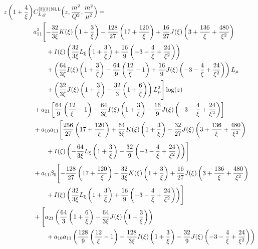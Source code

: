 \documentclass[a4paper]{article}
\begin{document}
\begin{equation}
	\begin{split}
		z \left(1 + \frac{4}{\xi}\right) &C_{L,g}^{[3](3) \rm NLL}\Bigl(z,\frac{m^2}{Q^2},\frac{m^2}{\mu^2}\Bigr)= \\
		& a_{11}^2 \Biggl[ -\frac{32}{3 \xi} K(\xi) \left(1 + \frac{3}{\xi}\right) - \frac{128}{27} \left(17 + \frac{120}{\xi}\right) + \frac{16}{27} J(\xi) \left(3 + \frac{136}{\xi} + \frac{480}{\xi^2}\right) \\
		&\qquad + I(\xi) \left(\frac{32}{3\xi} L_\xi \left(1 + \frac{3}{\xi}\right) + \frac{16}{9} \left(-3 - \frac{4}{\xi} + \frac{24}{\xi^2}\right)\right) \\
	 	& \qquad + \left(\frac{64}{3\xi} I(\xi) \left(1 + \frac{3}{\xi}\right) - \frac{64}{9} \left(\frac{12}{\xi} - 1\right) + \frac{16}{9} J(\xi) \left(-3 - \frac{4}{\xi} + \frac{24}{\xi^2}\right)\right) L_\mu \\
		& \qquad + \left(\frac{32}{3\xi} J(\xi) \left(1 + \frac{3}{\xi}\right) - \frac{32}{3} \left(1 + \frac{6}{\xi}\right)\right) L_\mu^2\Biggr] \log(z) \\
		& + a_{21} \left[\frac{64}{9} \left(\frac{12}{\xi} - 1\right) -\frac{64}{3\xi} I(\xi)  \left(1 + \frac{3}{\xi}\right) - \frac{16}{9} J(\xi) \left(-3 - \frac{4}{\xi} + \frac{24}{\xi^2}\right)\right] \\
		& + a_{10} a_{11} \Biggl[\frac{256}{27} \left(17 + \frac{120}{\xi}\right) + \frac{64}{3\xi} K(\xi) \left(1 + \frac{3}{\xi}\right) - \frac{32}{27} J(\xi) \left(3 + \frac{136}{\xi} + \frac{480}{\xi^2}\right) \\
		& \qquad + I(\xi) \left(-\frac{64}{3\xi} L_\xi \left(1 + \frac{3}{\xi}\right) - \frac{32}{9} \left(-3 - \frac{4}{\xi} + \frac{24}{\xi^2}\right)\right)\Biggr] \\
		& + a_{11} \beta_0 \Biggl[- \frac{128}{27} \left(17 + \frac{120}{\xi}\right) -\frac{32}{3\xi} K(\xi) \left(1 + \frac{3}{\xi}\right) + \frac{16}{27} J(\xi) \left(3 + \frac{136}{\xi} + \frac{480}{\xi^2}\right) \\
		& \qquad+ I(\xi) \left(\frac{32}{3\xi} L_\xi \left(1 + \frac{3}{\xi}\right) + \frac{16}{9} \left(-3 - \frac{4}{\xi} + \frac{24}{\xi^2}\right)\right)\Biggr] \\
		& + \Biggl[a_{21} \left(\frac{64}{3} \left(1 + \frac{6}{\xi} \right) -\frac{64}{3\xi} J(\xi) \left(1 + \frac{3}{\xi}\right) \right) \\
		& \qquad + a_{10} a_{11} \left(\frac{128}{9} \left(\frac{12}{\xi} - 1\right) -\frac{128}{3\xi} I(\xi) \left(1 + \frac{3}{\xi}\right) - \frac{32}{9} J(\xi) \left(-3 - \frac{4}{\xi} + \frac{24}{\xi^2}\right)\right) \\

\end{split}
\end{equation}
\end{document}
